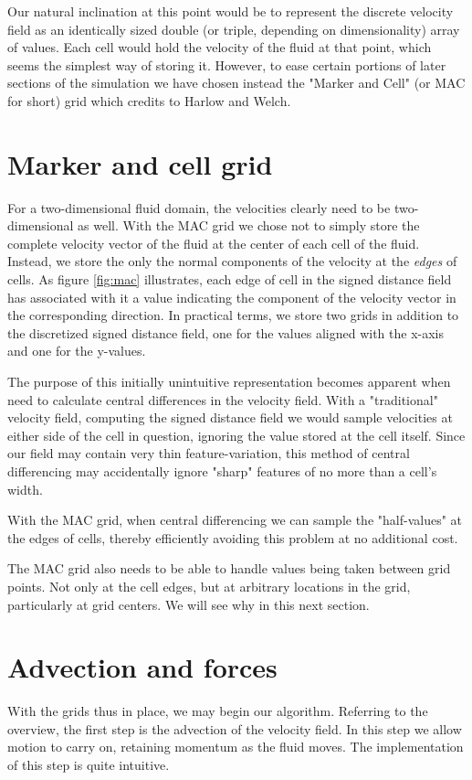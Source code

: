 Our natural inclination at this point would be to represent the discrete velocity field as an identically sized double (or triple, depending on dimensionality) array of values. Each cell would hold the velocity of the fluid at that point, which seems the simplest way of storing it. However, to ease certain portions of later sections of the simulation we have chosen instead the "Marker and Cell" (or MAC for short) grid which  credits to Harlow and Welch.

\section{Marker and cell grid}
For a two-dimensional fluid domain, the velocities clearly need to be two-dimensional as well. With the MAC grid we chose not to simply store the complete velocity vector of the fluid at the center of each cell of the fluid. Instead, we store the only the normal components of the velocity at the \textit{edges} of cells. As figure \vref{fig:mac} illustrates, each edge of cell in the signed distance field has associated with it a value indicating the component of the velocity vector in the corresponding direction. In practical terms, we store two grids in addition to the discretized signed distance field, one for the values aligned with the x-axis and one for the y-values.

The purpose of this initially unintuitive representation becomes apparent when need to calculate central differences in the velocity field. With a "traditional" velocity field, computing the signed distance field we would sample velocities at either side of the cell in question, ignoring the value stored at the cell itself. Since our field may contain very thin feature-variation, this method of central differencing may accidentally ignore "sharp" features of no more than a cell's width.

With the MAC grid, when central differencing we can sample the "half-values" at the edges of cells, thereby efficiently avoiding this problem at no additional cost.

The MAC grid also needs to be able to handle values being taken between grid points. Not only at the cell edges, but at arbitrary locations in the grid, particularly at grid centers. We will see why in this next section.

\section{Advection and forces}
With the grids thus in place, we may begin our algorithm. Referring to the overview, the first step is the advection of the velocity field. In this step we allow motion to carry on, retaining momentum as the fluid moves. The implementation of this step is quite intuitive.

